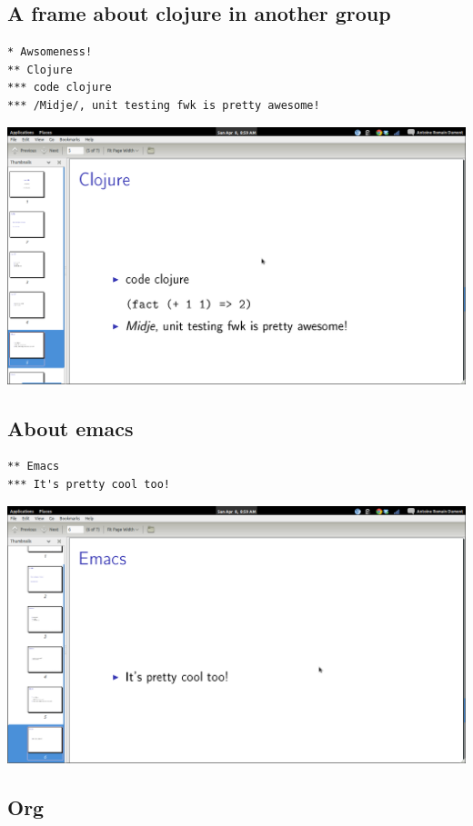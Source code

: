 \documentclass[11pt]{article}
\begin{document}
\subsection{A frame about clojure in another group}
\label{sec-3-7}


\begin{verbatim}
* Awsomeness!
** Clojure
*** code clojure
*** /Midje/, unit testing fwk is pretty awesome!
\end{verbatim}

\includegraphics[width=.9\linewidth]{./org-beamer-examples/frame-clojure.png}
\subsection{About emacs}
\label{sec-3-8}


\begin{verbatim}
** Emacs
*** It's pretty cool too!
\end{verbatim}

\includegraphics[width=.9\linewidth]{./org-beamer-examples/frame-emacs.png}
\subsection{Org}
\label{sec-3-9}
\end{document}
